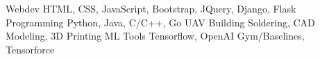 

\begin{cvskills}


  \cvskill
    {Webdev} %
    {HTML, CSS, JavaScript, Bootstrap, JQuery, Django, Flask} %
  \cvskill
    {Programming} %
    {Python, Java, C/C++, Go} %
  \cvskill
    {UAV Building} %
    {Soldering, CAD Modeling, 3D Printing} %
  \cvskill
    {ML Tools} %
    {Tensorflow, OpenAI Gym/Baselines, Tensorforce} %

\end{cvskills}
